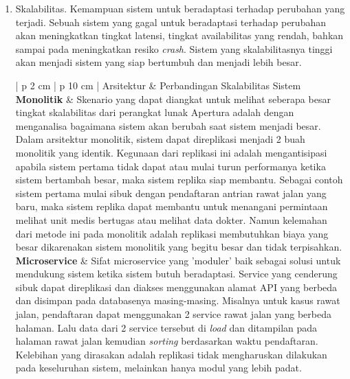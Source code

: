 \begin{enumerate}[leftmargin=*]
\begin{table}[H]
\begin{adjustbox}{width=1\textwidth}
\begin{tabular}{| p {2 cm} | p {10 cm} |}
				\textit{Drawback} : 
				\begin{enumerate}[leftmargin=*]
					\item Cost yang lebih besar dikarenakan kebutuhan menyiapkan \textit{server} tambahan untuk setiap service yang di\textit{deploy}.
					\item Dibutuhkan usaha yang lebih besar untuk mengawasi banyak \textit{server}.
				\end{enumerate}\\
				\hline
			\end{tabular}
		\end{adjustbox}
	\end{table}
	\newpage
	\item Skalabilitas. Kemampuan sistem untuk beradaptasi terhadap perubahan yang terjadi. Sebuah sistem yang gagal untuk beradaptasi terhadap perubahan akan meningkatkan tingkat latensi, tingkat availabilitas yang rendah, bahkan sampai pada meningkatkan resiko \textit{crash}. Sistem yang skalabilitasnya tinggi akan menjadi sistem yang siap bertumbuh dan menjadi lebih besar.
	\begin{table}[H]
		\small
		\begin{adjustbox}{width=1\textwidth}
			\begin{tabular}{| p {2 cm} | p {10 cm} |}
				\hline
				Arsitektur & Perbandingan Skalabilitas Sistem\\
				\hline
				\textbf{Monolitik} & Skenario yang dapat diangkat untuk melihat seberapa besar tingkat skalabilitas dari perangkat lunak Apertura adalah dengan menganalisa bagaimana sistem akan berubah saat sistem menjadi besar. Dalam arsitektur monolitik, sistem dapat direplikasi menjadi 2 buah monolitik yang identik. Kegunaan dari replikasi ini adalah mengantisipasi apabila sistem pertama tidak dapat atau mulai turun performanya ketika sistem bertambah besar, maka sistem replika siap membantu. Sebagai contoh sistem pertama mulai sibuk dengan pendaftaran antrian rawat jalan yang baru, maka sistem replika dapat membantu untuk menangani permintaan melihat unit medis bertugas atau melihat data dokter. Namun kelemahan dari metode ini pada monolitik adalah replikasi membutuhkan biaya yang besar dikarenakan sistem monolitik yang begitu besar dan tidak terpisahkan.\\
				\hline
				\textbf{Microservice} & Sifat microservice yang 'moduler' baik sebagai solusi untuk mendukung sistem ketika sistem butuh beradaptasi. Service yang cenderung sibuk dapat direplikasi dan diakses menggunakan alamat API yang berbeda dan disimpan pada databasenya masing-masing. Misalnya untuk kasus rawat jalan, pendaftaran dapat menggunakan 2 service rawat jalan yang berbeda halaman. Lalu data dari 2 service tersebut di \textit{load} dan ditampilan pada halaman rawat jalan kemudian \textit{sorting} berdasarkan waktu pendaftaran. Kelebihan yang dirasakan adalah replikasi tidak mengharuskan dilakukan pada keseluruhan sistem, melainkan hanya modul yang lebih padat.
				

\end{tabular}
\end{adjustbox}
\end{table}
\end{enumerate}
